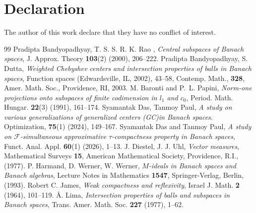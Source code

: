 \documentclass[11pt]{amsart}
\newcommand{\mr}{\mathscr}
\newcommand{\GC}{{\mbox{\rm (GC)}}}
\begin{document}
\section*{Declaration}
The author of this work declare that they have no conflict of interest.

\begin{thebibliography}{99}
 Pradipta Bandyopadhyay, T. S. S. R. K. Rao , {\em Central subspaces of {B}anach spaces}, J. Approx. Theory {\bf 103}(2) (2000), 206--222.
 Pradipta Bandyopadhyay, S. Dutta,  {\em Weighted Chebyshev centers and intersection properties of balls in {B}anach spaces}, Function spaces ({E}dwardsville, {IL}, 2002), 43--58, Contemp. Math., {\bf 328}, Amer. Math. Soc., Providence, RI, 2003.
M. Baronti and P.~L. Papini, {\em Norm-one projections onto subspaces of finite codimension in $l_1$ and $c_0$}, Period. Math. Hungar. {\bf 22}(3) (1991), 161--174.
Syamantak Das, Tanmoy Paul, {\em A study on various generalizations of generalized centers \GC in Banach spaces}. Optimization, {\bf 75}(1) (2024), 149--167.
Syamantak Das and Tanmoy Paul, {\em A study on $\mr{F}$-simultaneous approximative $\tau$-compactness property in Banach spaces}, Funct. Anal. Appl. {\bf 60}(1) (2026), 1--13.
J. Diestel, J. J. Uhl, {\em Vector measures}, Mathematical Surveys {\bf 15}, American Mathematical Society, Providence, R.I., (1977).
 P. Harmand, D. Werner, W. Werner, {\em {$M$}-ideals in {B}anach spaces and {B}anach algebras}, Lecture Notes in Mathematics {\bf 1547}, Springer-Verlag, Berlin, (1993).
 Robert C. James, {\em Weak compactness and reflexivity}, Israel J. Math.  {\bf 2} (1964), 101--119.
\AA. Lima, {\em Intersection properties of balls and subspaces in Banach spaces}, Trans. Amer. Math. Soc. {\bf 227} (1977), 1--62.

\end{thebibliography}
\end{document}
